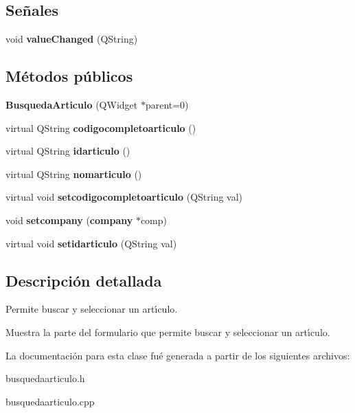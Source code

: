 \subsection*{Se\~{n}ales}
\begin{CompactItemize}
\item 
void {\bf value\-Changed} (QString)\label{classBusquedaArticulo_l0}

\end{CompactItemize}
\subsection*{M\'{e}todos p\'{u}blicos}
\begin{CompactItemize}
\item 
{\bf Busqueda\-Articulo} (QWidget $\ast$parent=0)\label{classBusquedaArticulo_a0}

\item 
virtual QString {\bf codigocompletoarticulo} ()\label{classBusquedaArticulo_a1}

\item 
virtual QString {\bf idarticulo} ()\label{classBusquedaArticulo_a2}

\item 
virtual QString {\bf nomarticulo} ()\label{classBusquedaArticulo_a3}

\item 
virtual void {\bf setcodigocompletoarticulo} (QString val)\label{classBusquedaArticulo_a4}

\item 
void {\bf setcompany} ({\bf company} $\ast$comp)\label{classBusquedaArticulo_a5}

\item 
virtual void {\bf setidarticulo} (QString val)\label{classBusquedaArticulo_a6}

\end{CompactItemize}


\subsection{Descripci\'{o}n detallada}
Permite buscar y seleccionar un art\'{\i}culo. 

Muestra la parte del formulario que permite buscar y seleccionar un art\'{\i}culo. 



La documentaci\'{o}n para esta clase fu\'{e} generada a partir de los siguientes archivos:\begin{CompactItemize}
\item 
busquedaarticulo.h\item 
busquedaarticulo.cpp\end{CompactItemize}
